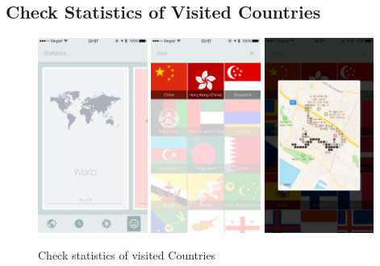 \documentclass[12pt,a4paper]{article}
\begin{document}
        \subsection{Check Statistics of Visited Countries} %
            \label{sec:statistics-of-visited-countries}
            \begin{figure}[H]
                \includegraphics[width=0.32\textwidth]{4-1-7-a}
                \includegraphics[width=0.32\textwidth]{4-1-7-b}
                \includegraphics[width=0.32\textwidth]{4-1-7-c}
                \centering
                \caption{Check statistics of visited Countries}
                \label{fig:country-statistics}
            \end{figure}
            
\end{document}
